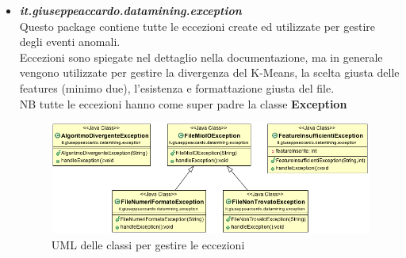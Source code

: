 \documentclass[a4paper, oneside]{book}
\begin{document}
\begin{itemize}
 \item \textit{\textbf{it.giuseppeaccardo.datamining.exception}}\\
 Questo package contiene tutte le eccezioni create ed utilizzate per gestire degli eventi anomali. \\
 Eccezioni sono spiegate nel dettaglio nella documentazione, ma in generale vengono utilizzate per gestire la divergenza del K-Means, la scelta giusta delle features (minimo due), l'esistenza e formattazione giusta del file. \\
 NB tutte le eccezioni hanno come super padre la classe \textbf{Exception}
  \begin{figure}[htp]
\centering
\includegraphics[width=14cm]{umlException.png}
\caption{UML delle classi per gestire le eccezioni}
\label{fig:uml eccezioni}
\end{figure}


\end{itemize}
\end{document}
